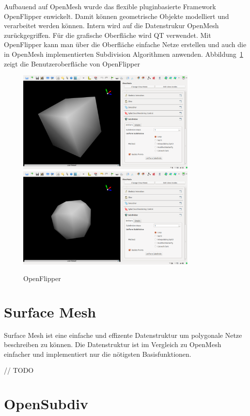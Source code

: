 Aufbauend auf OpenMesh wurde das flexible pluginbasierte Framework OpenFlipper enwickelt.
Damit können geometrische Objekte modelliert und verarbeitet werden können. Intern wird auf die Datenstrukur OpenMesh zurückgegriffen.
Für die grafische Oberfläche wird QT verwendet.
Mit OpenFlipper kann man über die Oberfläche einfache Netze erstellen und auch die in OpenMesh implementierten Subdivision Algorithmen anwenden.
Abbildung~\ref{fig:openflipper} zeigt die Benutzeroberfläche von OpenFlipper
\begin{figure}[h]
  \caption{OpenFlipper}
  \centering
  \includegraphics[width=0.8\textwidth]{content/media/openflipper_cube}
  \includegraphics[width=0.8\textwidth]{content/media/openflipper_loop}
  \label{fig:openflipper}
\end{figure}


\section{Surface Mesh}

Surface Mesh ist eine einfache und effizente Datenstruktur um polygonale Netze beschreiben zu können.
Die Datenstruktur ist im Vergleich zu OpenMesh einfacher und implementiert nur die nötigsten Basisfunktionen.

// TODO

\section{OpenSubdiv}

